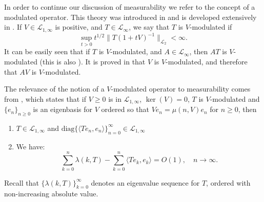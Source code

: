     In order to continue our discussion of measurability we refer to the concept of a modulated operator. This
    theory was introduced in \cite{KLPS} and is developed extensively in \cite[Section 11.2]{LSZ}. If $V \in \mathcal{L}_{1,\infty}$ is positive,
    and $T \in \mathcal{L}_\infty$, we say that $T$ is $V$-modulated if
    \begin{equation*}
        \sup_{t > 0} t^{1/2}\|T(1+tV)^{-1}\|_{\mathcal{L}_2} < \infty.
    \end{equation*}
    It can be easily seen that if $T$ is $V$-modulated, and $A \in \mathcal{L}_\infty$, then $AT$ is $V$-modulated (this is also \cite[Proposition 11.2.2]{LSZ}).
    It is proved in \cite[Lemma 11.2.8]{LSZ} that $V$ is $V$-modulated, and therefore that $AV$ is $V$-modulated.
    
    The relevance of the notion of a $V$-modulated operator to measurability comes from \cite[Theorem 11.2.3]{LSZ}, which states
    that if $V \geq 0$ is in $\mathcal{L}_{1,\infty}$, $\ker(V) = 0$, $T$ is $V$-modulated and $\{e_n\}_{n\geq 0}$ is an eigenbasis for $V$ ordered
    so that $Ve_n = \mu(n,V)e_n$ for $n\geq 0$, then
    \begin{enumerate}[{\rm (a)}]
        \item $T \in \mathcal{L}_{1,\infty}$ and $\mathrm{diag}\{\langle Te_n,e_n\rangle\}_{n=0}^\infty \in \mathcal{L}_{1,\infty}$
        \item We have:
            \begin{equation*}
                \sum_{k=0}^n \lambda(k,T) - \sum_{k=0}^n \langle Te_k,e_k\rangle = O(1),\quad n\to\infty.
            \end{equation*}
    \end{enumerate}
    Recall that $\{\lambda(k,T)\}_{k= 0}^\infty$ denotes an eigenvalue sequence for $T$, ordered with non-increasing absolute value.

